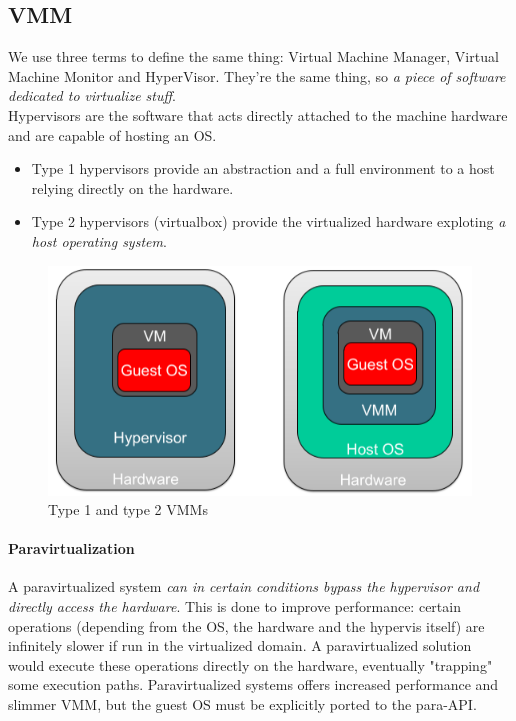 \documentclass[10pt,a4paper]{article}
\begin{document}
			\subsection{VMM}
				We use three terms to define the same thing: Virtual Machine Manager, Virtual Machine Monitor and HyperVisor. They're the same thing, so \emph{a piece of software dedicated to virtualize stuff}.\\
				Hypervisors are the software that acts directly attached to the machine hardware and are capable of hosting an OS.
				\begin{itemize}
					\item Type 1 hypervisors provide an abstraction and a full environment to a host relying directly on the hardware.
					\item Type 2 hypervisors (virtualbox) provide the virtualized hardware exploting \emph{a host operating system}.
				\end{itemize}
				\begin{figure}[H]
					\centering
					\includegraphics[width = \textwidth]{./images/VMMs.png}
					\caption{Type 1 and type 2 VMMs}
				\end{figure}
				
				\paragraph{Paravirtualization}
					A paravirtualized system \emph{can in certain conditions bypass the hypervisor and directly access the hardware}. This is done to improve performance: certain operations (depending from the OS, the hardware and the hypervis itself) are infinitely slower if run in the virtualized domain. A paravirtualized solution would execute these operations directly on the hardware, eventually "trapping" some execution paths. Paravirtualized systems offers increased performance and slimmer VMM, but the guest OS must be explicitly ported to the para-API.
				
\end{document}
